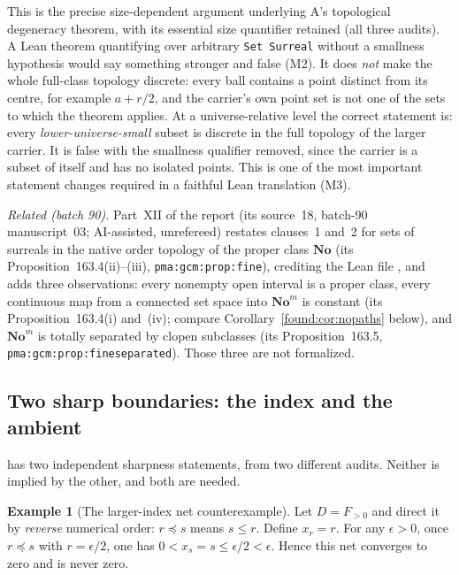 \documentclass[11pt,letterpaper]{article}
\numberwithin{equation}{section}
\theoremstyle{definition}
\newtheorem{example}[theorem]{Example}
\theoremstyle{remark}
\newcommand{\No}{\mathbf{No}}
\begin{document}
This is the precise size-dependent argument underlying A's topological
degeneracy theorem, with its essential size quantifier retained (all three
audits). A Lean theorem quantifying over arbitrary \texttt{Set Surreal} without
a smallness hypothesis would say something stronger and false (M2). It does
\emph{not} make the whole full-class topology discrete: every ball contains a
point distinct from its centre, for example $a+r/2$, and the carrier's own point
set is not one of the sets to which the theorem applies. At a universe-relative
level the correct statement is: every \emph{lower-universe-small} subset is
discrete in the full topology of the larger carrier. It is false with the
smallness qualifier removed, since the carrier is a subset of itself and has no
isolated points. This is one of the most important statement changes required in
a faithful Lean translation (M3).

\emph{Related (batch 90).} Part~XII of the report
(its source~18, batch-90 manuscript~03; AI-assisted, unrefereed) restates
clauses~1 and~2 for sets of surreals in the native order topology of the
proper class $\No$ (its Proposition~163.4(ii)--(iii),
\texttt{pma:gcm:prop:fine}), crediting the Lean file
, and adds three observations: every nonempty
open interval is a proper class, every continuous map from a connected set
space into $\No^m$ is constant (its Proposition~163.4(i) and~(iv); compare
Corollary~\ref{found:cor:nopaths} below), and $\No^m$ is totally separated by clopen
subclasses (its Proposition~163.5, \texttt{pma:gcm:prop:fineseparated}).
Those three are not formalized.

\subsection{Two sharp boundaries: the index and the ambient}
\label{found:sub:boundaries}
 has two independent sharpness statements, from two
different audits. Neither is implied by the other, and both are needed.

\begin{example}[The larger-index net counterexample]\label{found:ex:largerindex}
Let $D=F_{>0}$ and direct it by \emph{reverse} numerical order: $r\preceq s$
means $s\le r$. Define $x_r=r$. For any $\epsilon>0$, once $r\preceq s$ with
$r=\epsilon/2$, one has $0<x_s=s\le\epsilon/2<\epsilon$. Hence this net
converges to zero and is never zero.
\end{example}
\end{document}
